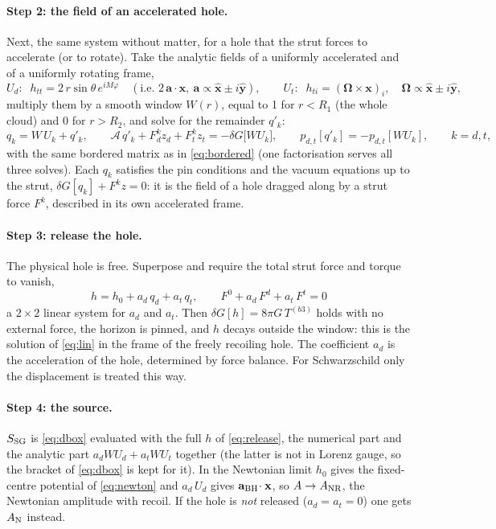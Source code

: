 \documentclass[11pt]{article}
\newcommand{\bx}{\mathbf{x}}\newcommand{\by}{\mathbf{y}}
\begin{document}
\paragraph{Step 2: the field of an accelerated hole.} Next, the same system without matter, for a hole that the strut forces to
accelerate (or to rotate). Take the analytic fields of a uniformly accelerated and of a uniformly rotating frame,
\begin{equation}
U_d:\;\;h_{tt}=2\,r\sin\theta\,e^{iM\varphi}\quad(\text{i.e. }2\,\mathbf a\!\cdot\!\bx,\ \mathbf a\propto\hat{\mathbf x}\pm i\hat{\mathbf y}),\qquad
U_t:\;\;h_{ti}=(\boldsymbol\Omega\times\bx)_i,\quad\boldsymbol\Omega\propto\hat{\mathbf x}\pm i\hat{\mathbf y},
\end{equation}
multiply them by a smooth window $W(r)$, equal to 1 for $r<R_1$ (the whole cloud) and 0 for $r>R_2$, and solve for the remainder $q'_k$:
\begin{equation}
q_k=W\,U_k+q'_k,\qquad
\mathcal A\,q'_k+F^k_d z_d+F^k_t z_t=-\delta G\big[W U_k\big],\qquad p_{d,t}[q'_k]=-p_{d,t}[W U_k],\qquad k=d,t,
\end{equation}
with the same bordered matrix as in \eqref{eq:bordered} (one factorisation serves all three solves). Each $q_k$ satisfies the pin
conditions and the vacuum equations up to the strut, $\delta G[q_k]+F^kz=0$: it is the field of a hole dragged along by a strut force
$F^k$, described in its own accelerated frame.

\paragraph{Step 3: release the hole.} The physical hole is free. Superpose and require the total strut force and torque to vanish,
\begin{equation}
\boxed{\;h=h_0+a_d\,q_d+a_t\,q_t,\qquad F^0+a_d\,F^d+a_t\,F^t=0\;} \label{eq:release}
\end{equation}
a $2\times2$ linear system for $a_d$ and $a_t$. Then $\delta G[h]=8\pi G\,T^{(b3)}$ holds with no external force, the horizon is pinned,
and $h$ decays outside the window: this is the solution of \eqref{eq:lin} in the frame of the freely recoiling hole. The coefficient
$a_d$ is the acceleration of the hole, determined by force balance. For Schwarzschild only the displacement is treated this way.

\paragraph{Step 4: the source.} $S_{\rm SG}$ is \eqref{eq:dbox} evaluated with the full $h$ of \eqref{eq:release}, the numerical part and the
analytic part $a_dWU_d+a_tWU_t$ together (the latter is not in Lorenz gauge, so the bracket of \eqref{eq:dbox} is kept for it).
In the Newtonian limit $h_0$ gives the fixed-centre potential of \eqref{eq:newton} and $a_d\,U_d$ gives $\mathbf a_{\rm BH}\!\cdot\bx$,
so $A\to A_{\rm NR}$, the Newtonian amplitude with recoil. If the hole is \emph{not} released ($a_d=a_t=0$) one gets $A_{\rm N}$ instead.
\end{document}
